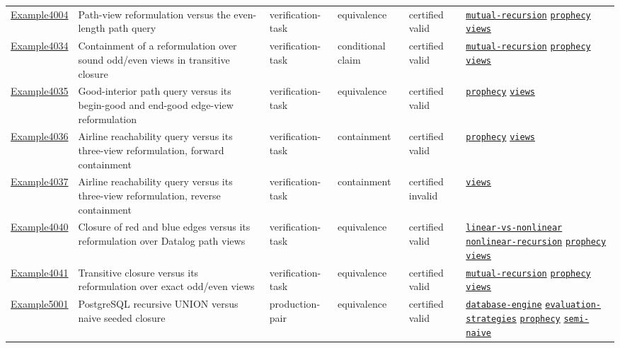 \documentclass[10pt]{article}
\begin{document}
\begin{longtable}{@{}lp{}p{}p{}p{}p{}@{}}
\hyperref[case:Example4004]{Example4004} & Path-view reformulation versus the even-length path query & verification-task & equivalence & certified valid & {\scriptsize \hyperref[tag:mutual-recursion]{\texttt{mutual-recursion}} \hyperref[tag:prophecy]{\texttt{prophecy}} \hyperref[tag:views]{\texttt{views}}} \\
\hyperref[case:Example4034]{Example4034} & Containment of a reformulation over sound odd/even views in transitive closure & verification-task & conditional claim & certified valid & {\scriptsize \hyperref[tag:mutual-recursion]{\texttt{mutual-recursion}} \hyperref[tag:prophecy]{\texttt{prophecy}} \hyperref[tag:views]{\texttt{views}}} \\
\hyperref[case:Example4035]{Example4035} & Good-interior path query versus its begin-good and end-good edge-view reformulation & verification-task & equivalence & certified valid & {\scriptsize \hyperref[tag:prophecy]{\texttt{prophecy}} \hyperref[tag:views]{\texttt{views}}} \\
\hyperref[case:Example4036]{Example4036} & Airline reachability query versus its three-view reformulation, forward containment & verification-task & containment & certified valid & {\scriptsize \hyperref[tag:prophecy]{\texttt{prophecy}} \hyperref[tag:views]{\texttt{views}}} \\
\hyperref[case:Example4037]{Example4037} & Airline reachability query versus its three-view reformulation, reverse containment & verification-task & containment & certified invalid & {\scriptsize \hyperref[tag:views]{\texttt{views}}} \\
\hyperref[case:Example4040]{Example4040} & Closure of red and blue edges versus its reformulation over Datalog path views & verification-task & equivalence & certified valid & {\scriptsize \hyperref[tag:linear-vs-nonlinear]{\texttt{linear-vs-nonlinear}} \hyperref[tag:nonlinear-recursion]{\texttt{nonlinear-recursion}} \hyperref[tag:prophecy]{\texttt{prophecy}} \hyperref[tag:views]{\texttt{views}}} \\
\hyperref[case:Example4041]{Example4041} & Transitive closure versus its reformulation over exact odd/even views & verification-task & equivalence & certified valid & {\scriptsize \hyperref[tag:mutual-recursion]{\texttt{mutual-recursion}} \hyperref[tag:prophecy]{\texttt{prophecy}} \hyperref[tag:views]{\texttt{views}}} \\
\hyperref[case:Example5001]{Example5001} & PostgreSQL recursive UNION versus naive seeded closure & production-pair & equivalence & certified valid & {\scriptsize \hyperref[tag:database-engine]{\texttt{database-engine}} \hyperref[tag:evaluation-strategies]{\texttt{evaluation-strategies}} \hyperref[tag:prophecy]{\texttt{prophecy}} \hyperref[tag:semi-naive]{\texttt{semi-naive}}} \\

\end{longtable}
\end{document}
